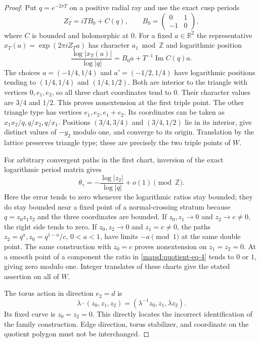 \begin{proof}
Put $q=e^{-2\pi T}$ on a positive radial ray and use the exact
cusp periods
\[
 Z_T=iTB_0+C(q),\qquad
 B_0=\begin{pmatrix}0&1\\-1&0\end{pmatrix},
\]
where $C$ is bounded and holomorphic at $0$.  For a fixed
$a\in\mathbb R^2$ the representative
$x_T(a)=\exp(2\pi iZ_Ta)$ has character $a_1\bmod\mathbb Z$ and
logarithmic position
\[
 \frac{\log|x_T(a)|}{\log|q|}
 =B_0a+T^{-1}\operatorname{Im}C(q)a.
 \label{mapsI:quotient-eq-3}
\]
The choices $a=(-1/4,1/4)$ and $a'=(-1/2,1/4)$ have logarithmic
positions tending to $(1/4,1/4)$ and $(1/4,1/2)$.
Both are interior to the triangle with vertices $0,e_1,e_2$,
so all three chart coordinates tend to $0$.  Their character
values are $3/4$ and $1/2$.  This proves nonextension at the
first triple point.  The other triangle type has vertices
$e_1,e_2,e_1+e_2$.  Its coordinates can be taken as
$x_1x_2/q,q/x_2,q/x_1$.  Positions $(3/4,3/4)$ and
$(3/4,1/2)$ lie in its interior, give distinct values of $-y_2$
modulo one, and converge to its origin.  Translation by the
lattice preserves triangle type; these are precisely the two
triple points of $W$.

For arbitrary convergent paths in the first chart, inversion
of the exact logarithmic period matrix gives
\[
 \theta_\gamma=-\frac{\log|z_2|}{\log|q|}+o(1)\pmod{\mathbb Z}.
 \label{mapsI:quotient-eq-4}
\]
Here the error tends to zero whenever the logarithmic ratios
stay bounded; they do stay bounded near a fixed point of a
normal-crossing stratum because $q=z_0z_1z_2$ and the three
coordinates are bounded.  If $z_0,z_1\to0$ and $z_2\to c\ne0$,
the right side tends to zero.  If $z_0,z_2\to0$ and $z_1=c\ne0$,
the paths $z_2=q^a,z_0=q^{1-a}/c$, $0<a<1$, have limits
$-a\pmod1$ at the same double point.  The same construction
with $z_0=c$ proves nonextension on $z_1=z_2=0$.
At a smooth point of a component the ratio in \eqref{mapsI:quotient-eq-4} tends
to $0$ or $1$, giving zero modulo one.  Integer translates
of these charts give the stated assertion on all of $W$.

The torus action in direction $e_2=d$ is
\[
 \lambda\cdot(z_0,z_1,z_2)
       =(\lambda^{-1}z_0,z_1,\lambda z_2).
\]
Its fixed curve is $z_0=z_2=0$.  This directly locates the
incorrect identification of the family construction.  Edge direction,
torus stabilizer, and coordinate on the quotient polygon must
not be interchanged.
\end{proof}

